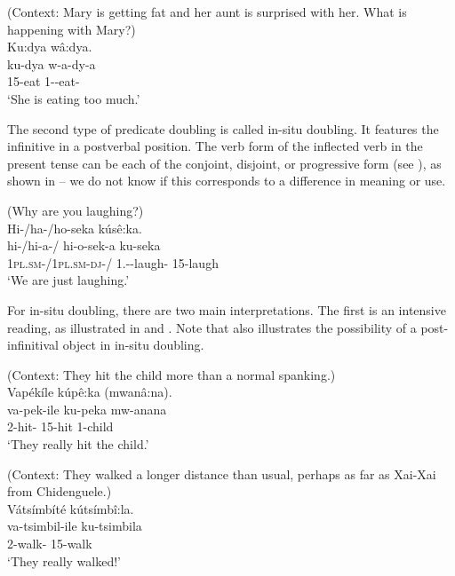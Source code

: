 \documentclass[output=paper]{langscibook}
\begin{document}
\ex
\label{bkm:Ref121149950}
(Context: Mary is getting fat and her aunt is surprised with her. What is happening with Mary?)\\
Ku:dya wâ:dya.\\
\gll
ku-dya  w-a-dy-a\\
15-eat  1\SM{}-\DJ{}-eat-\FV{}\\
\glt
‘She is eating too much.’\\

\z

The second type of predicate doubling is called in-situ doubling. It features the infinitive in a postverbal position. The verb form of the inflected verb in the present tense can be each of the conjoint, disjoint, or progressive form (see ), as shown in  – we do not know if this corresponds to a difference in meaning or use.

\ea
\label{bkm:Ref120700227}
(Why are you laughing?)\\
Hi-/ha-/ho-seka kúsê:ka.\\
\gll
hi-/hi-a-/  hi-o-sek-a  ku-seka\\
1\textsc{pl.sm-/1pl.sm-dj-/}  1\PL.\SM-\PROG{}-laugh-\FV{}  15-laugh\\
\glt ‘We are just laughing.’

\z

For in-situ doubling, there are two main interpretations. The first is an intensive reading, as illustrated in  and . Note that  also illustrates the possibility of a post-infinitival object in in-situ doubling.

\ea
\label{bkm:Ref120700365}
(Context: They hit the child more than a normal spanking.)\\
Vapékíle kúpê:ka (mwanâ:na).\\
\gll
va-pek-ile  ku-peka  mw-anana\\
2\SM{}-hit-\PFV{}  15-hit  1-child\\
\glt
‘They really hit the child.’\\

\z

\ea
\label{bkm:Ref120700370}
(Context: They walked a longer distance than usual, perhaps as far as Xai-Xai from Chidenguele.)\\
Vátsímbíté kútsímbî:la.\\
\gll
va-tsimbil-ile  ku-tsimbila\\
2\SM{}-walk-\PFV{}  15-walk\\
\glt
‘They really walked!’\\
\end{document}
